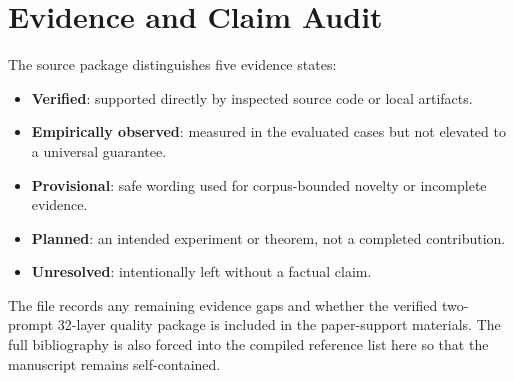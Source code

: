 \section{Evidence and Claim Audit}
\label{app:evidence}

\begin{table}[h]
  \centering
  \small
  
  \caption{Compact claim-to-evidence summary. A more detailed machine-readable matrix appears in .}
  \label{tab:claims}
\end{table}

The source package distinguishes five evidence states:
\begin{itemize}[leftmargin=1.5em]
  \item \textbf{Verified}: supported directly by inspected source code or local artifacts.
  \item \textbf{Empirically observed}: measured in the evaluated cases but not elevated to a universal guarantee.
  \item \textbf{Provisional}: safe wording used for corpus-bounded novelty or incomplete evidence.
  \item \textbf{Planned}: an intended experiment or theorem, not a completed contribution.
  \item \textbf{Unresolved}: intentionally left without a factual claim.
\end{itemize}

The file  records any remaining evidence gaps and whether the verified two-prompt 32-layer quality package is included in the paper-support materials. The full bibliography is also forced into the compiled reference list here so that the manuscript remains self-contained.

\nocite{tricco2018prisma,liu2024kivi,li2024snapkv,tang2024quest,zhang2023h2o,hao2026deltakv,zhu2025ojakv,liu2024clusterkv,yang2025attentionpredictor,ji2026echokv,feng2024adakv,wang2025commonkv,guo2024a2ats,magarshak2026pltries,salfati2026quantizationdominates,luo2026queryvisibility,haverbeck2026risk,chen2025pitfalls,kim2026polynomialcontext,kwon2023pagedattention,xiao2024infllm,deepseekai2024deepseekv2}
